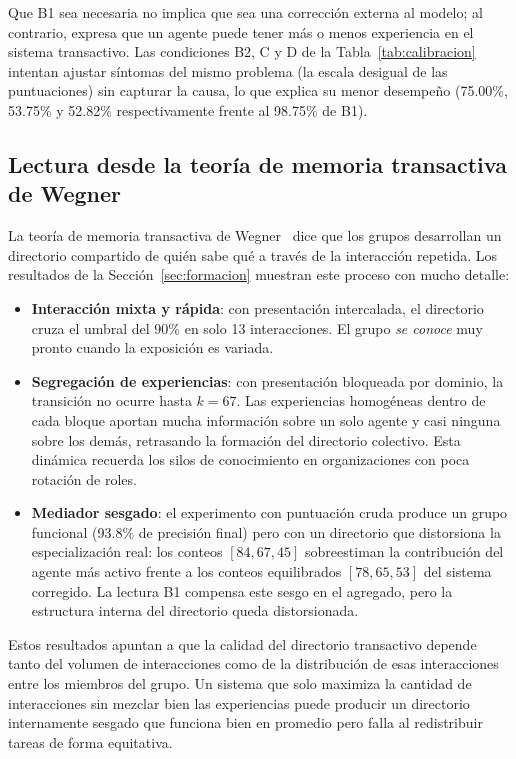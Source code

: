 Que B1 sea necesaria no implica que sea una corrección externa al modelo; al contrario, expresa que un agente puede tener más o menos experiencia en el sistema transactivo.
Las condiciones B2, C y D de la Tabla~\ref{tab:calibracion} intentan ajustar síntomas del mismo problema (la escala desigual de las puntuaciones) sin capturar la causa, lo que explica su menor desempeño (75.00\%, 53.75\% y 52.82\% respectivamente frente al 98.75\% de B1).

\subsection{Lectura desde la teoría de memoria transactiva de Wegner}
\label{sec:disc-wegner}

La teoría de memoria transactiva de Wegner~\cite{wegner1987transactive} dice que los grupos desarrollan un directorio compartido de quién sabe qué a través de la interacción repetida.
Los resultados de la Sección~\ref{sec:formacion} muestran este proceso con mucho detalle:

\begin{itemize}
    \item \textbf{Interacción mixta y rápida}: con presentación intercalada, el directorio cruza el umbral del 90\% en solo 13 interacciones.
    El grupo \textit{se conoce} muy pronto cuando la exposición es variada.
    \item \textbf{Segregación de experiencias}: con presentación bloqueada por dominio, la transición no ocurre hasta $k = 67$.
    Las experiencias homogéneas dentro de cada bloque aportan mucha información sobre un solo agente y casi ninguna sobre los demás, retrasando la formación del directorio colectivo.
    Esta dinámica recuerda los silos de conocimiento en organizaciones con poca rotación de roles.
    \item \textbf{Mediador sesgado}: el experimento con puntuación cruda produce un grupo funcional (93.8\% de precisión final) pero con un directorio que distorsiona la especialización real: los conteos $[84, 67, 45]$ sobreestiman la contribución del agente más activo frente a los conteos equilibrados $[78, 65, 53]$ del sistema corregido.
    La lectura B1 compensa este sesgo en el agregado, pero la estructura interna del directorio queda distorsionada.
\end{itemize}

Estos resultados apuntan a que la calidad del directorio transactivo depende tanto del volumen de interacciones como de la distribución de esas interacciones entre los miembros del grupo.
Un sistema que solo maximiza la cantidad de interacciones sin mezclar bien las experiencias puede producir un directorio internamente sesgado que funciona bien en promedio pero falla al redistribuir tareas de forma equitativa.

